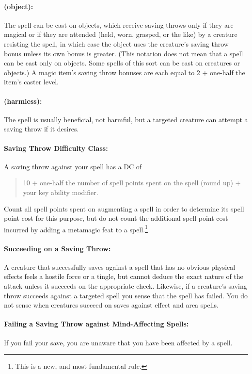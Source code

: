 \paragraph{(object):} The spell can be cast on objects, which receive saving throws only if they are magical or if they are attended (held, worn, grasped, or the like) by a creature resisting the spell, in which case the object uses the creature's saving throw bonus unless its own bonus is greater. (This notation does not mean that a spell can be cast only on objects. Some spells of this sort can be cast on creatures or objects.) A magic item's saving throw bonuses are each equal to 2 + one-half the item's caster level.

\paragraph{(harmless):} The spell is usually beneficial, not harmful, but a targeted creature can attempt a saving throw if it desires.

\paragraph{Saving Throw Difficulty Class:} 

A saving throw against your spell has a DC of
\begin{quote}
\centering
\large 
 {10 + one-half the number of spell points spent on the spell (round up) + your key ability modifier.}
\end{quote}
Count all spell points spent on augmenting a spell in order to determine its spell point cost for this purpose, 
but do not count the additional spell point cost incurred by adding a metamagic feat to a spell.\footnote{This is a new, and most fundamental rule.}

\paragraph{Succeeding on a Saving Throw:} A creature that successfully saves against a spell that has no obvious physical effects feels a hostile force or a tingle, but cannot deduce the exact nature of the attack unless it succeeds on the appropriate  check. 
Likewise, if a creature's saving throw succeeds against a targeted spell you sense that the spell has failed. 
You do not sense when creatures succeed on saves against effect and area spells.

\paragraph{Failing a Saving Throw against Mind-Affecting Spells:} If you fail your save, you are unaware that you have been affected by a spell.

